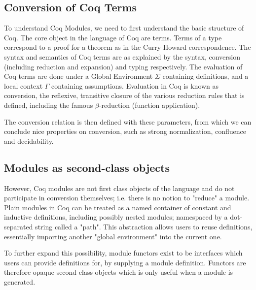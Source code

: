 \subsection{Conversion of Coq Terms}

To understand Coq Modules, we need to first understand the basic structure of
Coq. The core object in the language of Coq are terms. Terms of a type
correspond to a proof for a theorem as in the Curry-Howard correspondence.  The
syntax and semantics of Coq terms are as explained by the syntax,
 conversion (including reduction and expansion)
 and typing
respectively. The evaluation of Coq terms are done under a Global Environment
$\Sigma$ containing definitions, and a local context $\Gamma$ containing
assumptions. Evaluation in Coq is known as conversion, the reflexive, transitive
closure of the various reduction rules that is defined, including the famous
$\beta$-reduction (function application).

The conversion relation is then defined with these parameters, from which we can
conclude nice properties on conversion, such as strong normalization, confluence
and decidability.

\subsection{Modules as second-class objects}
However, Coq modules are not first class objects of the language and do not
participate in conversion themselves; i.e. there is no notion to "reduce" a
module. Plain modules in Coq can be treated as a named container of constant
and inductive definitions, including possibly nested modules; namespaced by a 
dot-separated string called a "path". This abstraction allows users to reuse
definitions, essentially importing another "global environment" into the current
one.

To further expand this possibility, module functors exist to be interfaces which
users can provide definitions for, by supplying a module definition. Functors
are therefore opaque second-class objects which is only useful when a module is
generated.

